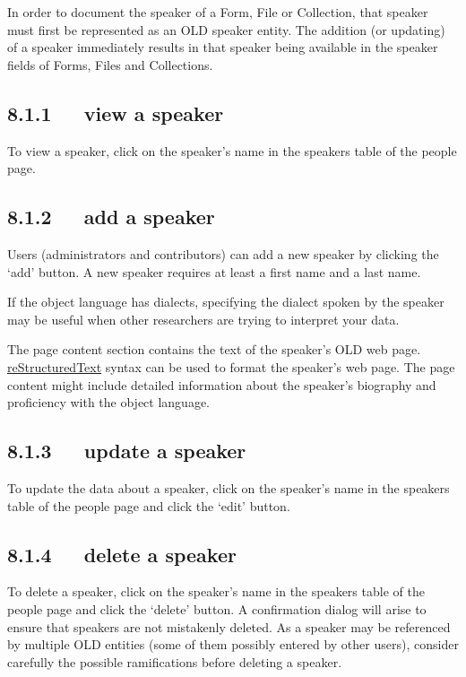 \documentclass[letterpaper,10pt,english]{sphinxmanual}
\begin{document}
In order to document the speaker of a Form, File or Collection, that speaker
must first be represented as an OLD speaker entity.  The addition (or updating)
of a speaker immediately results in that speaker being available in the speaker
fields of Forms, Files and Collections.


\subsection{8.1.1   view a speaker}
\label{documentation:view-a-speaker}
To view a speaker, click on the speaker's name in the speakers table of the
people page.


\subsection{8.1.2   add a speaker}
\label{documentation:add-a-speaker}
Users (administrators and contributors) can add a new speaker by clicking the
`add' button.  A new speaker requires at least a first name and a last name.

If the object language has dialects, specifying the dialect spoken by the
speaker may be useful when other researchers are trying to interpret your data.

The page content section contains the text of the speaker's OLD web page.
{\hyperref[documentation:restructuredtext]{reStructuredText}} syntax can be used to format the speaker's web page.  The page
content might include detailed information about the speaker's biography and
proficiency with the object language.


\subsection{8.1.3   update a speaker}
\label{documentation:update-a-speaker}
To update the data about a speaker, click on the speaker's name in the speakers
table of the people page and click the `edit' button.


\subsection{8.1.4   delete a speaker}
\label{documentation:delete-a-speaker}
To delete a speaker, click on the speaker's name in the speakers table of the
people page and click the `delete' button.  A confirmation dialog will arise to
ensure that speakers are not mistakenly deleted.  As a speaker may be referenced
by multiple OLD entities (some of them possibly entered by other users),
consider carefully the possible ramifications before deleting a speaker.
\end{document}
